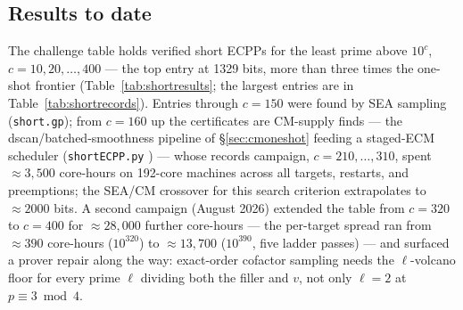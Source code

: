 \documentclass[11pt]{amsart}
\newcommand{\osf}{\cite{OSF}}
\theoremstyle{plain}
\theoremstyle{definition}
\theoremstyle{remark}
\begin{document}
\subsection{Results to date}\label{sec:shortresults}

The challenge table \cite{Short} holds verified short ECPPs for the least prime above $10^c$,
$c = 10, 20, \dots, 400$ --- the top entry at 1329 bits, more than three times the one-shot frontier
(Table~\ref{tab:shortresults}; the largest entries are in Table~\ref{tab:shortrecords}).  Entries
through $c = 150$ were found by SEA sampling (\texttt{short.gp}); from $c = 160$ up the
certificates are CM-supply finds --- the dscan/batched-smoothness pipeline of
\S\ref{sec:cmoneshot} feeding a staged-ECM scheduler (\texttt{shortECPP.py} \osf) --- whose
records campaign, $c = 210, \dots, 310$, spent ${\approx}3{,}500$ core-hours on 192-core machines
across all targets, restarts, and preemptions; the SEA/CM crossover for this search criterion
extrapolates to ${\approx}2000$ bits.  A second campaign (August 2026) extended the table from
$c = 320$ to $c = 400$ for ${\approx}28{,}000$ further core-hours --- the per-target spread ran
from ${\approx}390$ core-hours ($10^{320}$) to ${\approx}13{,}700$ ($10^{390}$, five ladder passes) --- and
surfaced a prover repair along the way: exact-order cofactor sampling needs the $\ell$-volcano
floor for every prime $\ell$ dividing both the filler and $v$, not only $\ell = 2$ at
$p \equiv 3 \bmod 4$.
\end{document}
